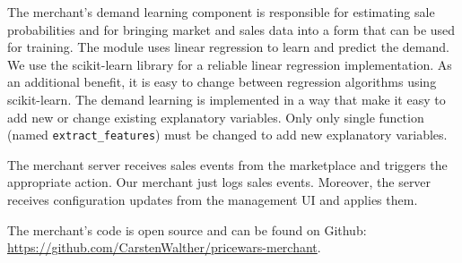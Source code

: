 The merchant's demand learning component is responsible for estimating sale probabilities and for bringing market and sales data into a form that can be used for training.
The module uses linear regression to learn and predict the demand.
We use the scikit-learn library for a reliable linear regression implementation.
As an additional benefit, it is easy to change between regression algorithms using scikit-learn.
The demand learning is implemented in a way that make it easy to add new or change existing explanatory variables.
Only only single function (named \texttt{extract\_features}) must be changed to add new explanatory variables.

The merchant server receives sales events from the marketplace and triggers the appropriate action.
Our merchant just logs sales events.
Moreover, the server receives configuration updates from the management UI and applies them.  

The merchant's code is open source and can be found on Github: \url{https://github.com/CarstenWalther/pricewars-merchant}.

